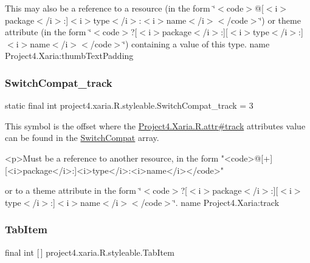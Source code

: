 This may also be a reference to a resource (in the form \char`\"{}$<$code$>$@\mbox{[}$<$i$>$package$<$/i$>$\+:\mbox{]}$<$i$>$type$<$/i$>$\+:$<$i$>$name$<$/i$>$$<$/code$>$\char`\"{}) or theme attribute (in the form \char`\"{}$<$code$>$?\mbox{[}$<$i$>$package$<$/i$>$\+:\mbox{]}\mbox{[}$<$i$>$type$<$/i$>$\+:\mbox{]}$<$i$>$name$<$/i$>$$<$/code$>$\char`\"{}) containing a value of this type.  name Project4.\+Xaria\+:thumb\+Text\+Padding \mbox{\label{classproject4_1_1xaria_1_1R_1_1styleable_af96cd765a1838db8e0772f079ce6fa52}} 
\subsubsection{\texorpdfstring{Switch\+Compat\+\_\+track}{SwitchCompat\_track}}
{\footnotesize\ttfamily static final int project4.\+xaria.\+R.\+styleable.\+Switch\+Compat\+\_\+track = 3\hspace{0.3cm}{\ttfamily [static]}}

This symbol is the offset where the \hyperlink{}{Project4.\+Xaria.\+R.\+attr\#track} attribute\textquotesingle{}s value can be found in the \hyperlink{classproject4_1_1xaria_1_1R_1_1styleable_a15d9950df3a97e57d9c57e4c4b7e8e87}{Switch\+Compat} array.

\begin{DoxyVerb}      <p>Must be a reference to another resource, in the form "<code>@[+][<i>package</i>:]<i>type</i>:<i>name</i></code>"
\end{DoxyVerb}
 or to a theme attribute in the form \char`\"{}$<$code$>$?\mbox{[}$<$i$>$package$<$/i$>$\+:\mbox{]}\mbox{[}$<$i$>$type$<$/i$>$\+:\mbox{]}$<$i$>$name$<$/i$>$$<$/code$>$\char`\"{}.  name Project4.\+Xaria\+:track \mbox{\label{classproject4_1_1xaria_1_1R_1_1styleable_aa9568e579aca04aeb8e914ce6277b875}} 
\subsubsection{\texorpdfstring{Tab\+Item}{TabItem}}
{\footnotesize\ttfamily final int \mbox{[}$\,$\mbox{]} project4.\+xaria.\+R.\+styleable.\+Tab\+Item\hspace{0.3cm}{\ttfamily [static]}}

